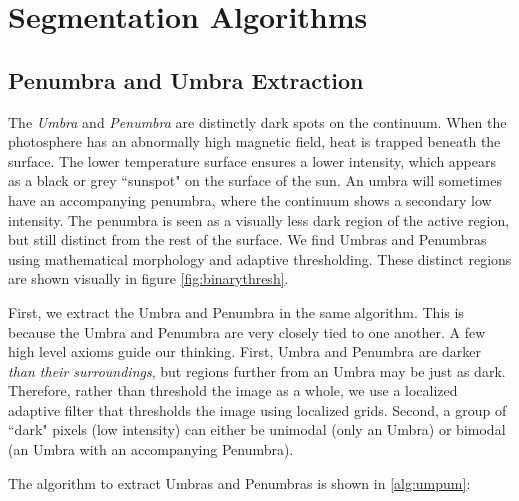 
\chapter{Segmentation Algorithms}
\label{appendix:algorithms}

\section{Penumbra and Umbra Extraction}
The \textit{Umbra} and \textit{Penumbra} are distinctly dark spots on the continuum. When the photosphere has an abnormally high magnetic field, heat is trapped beneath the surface. The lower temperature surface ensures a lower intensity, which appears as a black or grey ``sunspot" on the surface of the sun. An umbra will sometimes have an accompanying penumbra, where the continuum shows a secondary low intensity. The penumbra is seen as a visually less dark region of the active region, but still distinct from the rest of the surface. We find Umbras and Penumbras using mathematical morphology and adaptive thresholding. These distinct regions are shown visually in figure \ref{fig:binarythresh}.

First, we extract the Umbra and Penumbra in the same algorithm. This is because the Umbra and Penumbra are very closely tied to one another. A few high level axioms guide our thinking. First, Umbra and Penumbra are darker \textit{than their surroundings}, but regions further from an Umbra may be just as dark. Therefore, rather than threshold the image as a whole, we use a localized adaptive filter that thresholds the image using localized grids. Second, a group of ``dark" pixels (low intensity) can either be unimodal (only an Umbra) or bimodal (an Umbra with an accompanying Penumbra). 

The algorithm to extract Umbras and Penumbras is shown in \ref{alg:umpum}:

